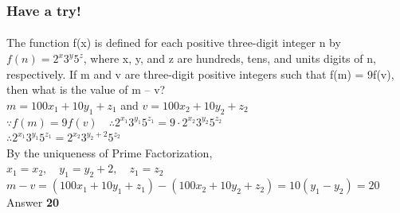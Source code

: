 \documentclass[
	11pt, %
]{beamer}
\begin{document}
\begin{frame}
	\frametitle{Have a try!}
	\framesubtitle{}
	The function f(x) is defined for each positive three-digit integer n by $f(n) = 2^x3^y5^z$,
where x, y, and z are hundreds, tens, and units digits of n, respectively. If m and v are
three-digit positive integers such that f(m) = 9f(v), then what is the value of m – v? \\
\bigskip
\pause
$m=100x_1 + 10y_1 + z_1$ and $v = 100x_2 + 10y_2 + z_2$\\
$\because f(m) = 9f(v) \quad \therefore 2^{x_1}3^{y_1}5^{z_1} = 9\cdot2^{x_2}3^{y_2}5^{z_2}$\\
$\therefore 2^{x_1}3^{y_1}5^{z_1} = 2^{x_2}3^{y_2 +2}5^{z_2}$ \\
\smallskip
By the uniqueness of Prime Factorization,\\
$x_1 = x_2, \quad y_1 = y_2 + 2,  \quad z_1 = z_2$\\
$m - v = (100x_1 + 10y_1 + z_1) - (100x_2 + 10y_2 + z_2) = 10(y_1 -y_2) = 20$\\

\bigskip
Answer \textbf{20}
\end{frame}

\end{document}

